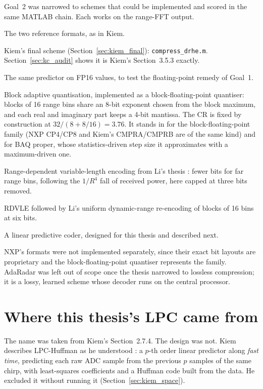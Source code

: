 Goal~2 was narrowed to schemes that could be implemented and scored in the same
MATLAB chain. Each works on the range-FFT output.

\begin{description}[leftmargin=!,labelwidth=26mm,style=nextline,font=\normalfont\bfseries]
\item[FP16, FX16] The two reference formats, as in Kiem.
\item[DRHE] Kiem's final scheme (Section~\ref{sec:kiem_final}):
\texttt{compress\_drhe.m}. Section~\ref{sec:kc_audit} shows it is Kiem's
Section~3.5.3 exactly.
\item[DRHEfp16] The same predictor on FP16 values, to test the floating-point
remedy of Goal~1.
\item[BAQ] Block adaptive quantisation, implemented as a block-floating-point
quantiser: blocks of 16 range bins share an 8-bit exponent chosen from the
block maximum, and each real and imaginary part keeps a 4-bit mantissa. The CR
is fixed by construction at $32/(8 + 8/16) = 3.76$. It stands in for the
block-floating-point family (NXP CP4/CP8 and Kiem's CMPRA/CMPRB are of the same
kind) and for BAQ proper, whose statistics-driven step size
\cite{kwok1989} it approximates with a maximum-driven one.
\item[RDVLE] Range-dependent variable-length encoding from Li's thesis
\cite{li2014}: fewer bits for far range bins, following the $1/R^4$ fall of
received power, here capped at three bits removed.
\item[RDVLE+UDRE] RDVLE followed by Li's uniform dynamic-range re-encoding of
blocks of 16 bins at six bits.
\item[LPC-Huffman] A linear predictive coder, designed for this thesis and
described next.
\end{description}

\noindent
NXP's formats were not implemented separately, since their exact bit layouts
are proprietary and the block-floating-point quantiser represents the family.
AdaRadar \cite{park2026} was left out of scope once the thesis narrowed to
lossless compression; it is a lossy, learned scheme whose decoder runs on the
central processor.

\section{Where this thesis's LPC came from}
\label{sec:jr_lpc}

The name was taken from Kiem's Section~2.7.4. The design was not. Kiem
describes LPC-Huffman as he understood \cite{meucci2022}: a $p$-th order linear predictor
along \emph{fast time}, predicting each raw ADC sample from the previous $p$
samples of the same chirp, with least-squares coefficients and a Huffman code
built from the data. He excluded it without running it
(Section~\ref{sec:kiem_space}).

